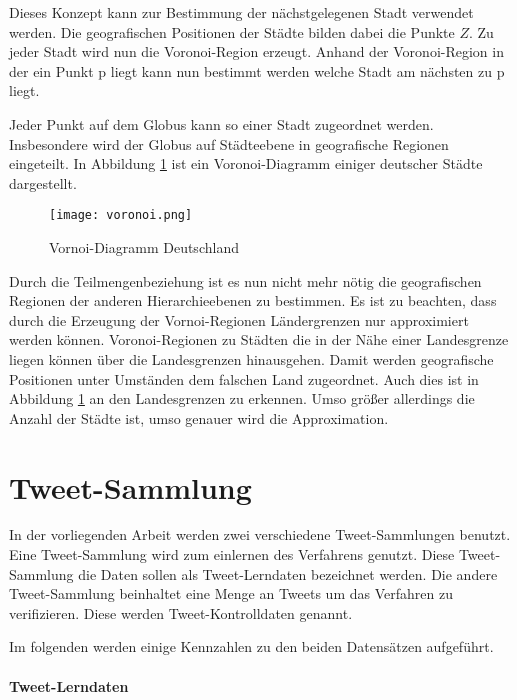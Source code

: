 				Dieses Konzept kann zur Bestimmung der nächstgelegenen Stadt verwendet werden. 
				Die geografischen Positionen der Städte bilden dabei die Punkte $Z$.
				Zu jeder Stadt wird nun die Voronoi-Region erzeugt. 
				Anhand der Voronoi-Region in der ein Punkt p liegt kann nun bestimmt werden welche Stadt am nächsten zu p liegt.

				Jeder Punkt auf dem Globus kann so einer Stadt zugeordnet werden.
				Insbesondere wird der Globus auf Städteebene in geografische Regionen eingeteilt.
				In Abbildung \ref{img:voronoi} ist ein Voronoi-Diagramm einiger deutscher Städte dargestellt.

				\begin{figure}[h!]
				\begin{center}
				\texttt{[image: voronoi.png]}
				\caption{Vornoi-Diagramm Deutschland}
				\label{img:voronoi}
				\end{center}
				\end{figure}	

				Durch die Teilmengenbeziehung ist es nun nicht mehr nötig die geografischen Regionen der anderen Hierarchieebenen zu bestimmen.
				Es ist zu beachten, dass durch die Erzeugung der Vornoi-Regionen Ländergrenzen nur approximiert werden können. 
				Voronoi-Regionen zu Städten die in der Nähe einer Landesgrenze liegen können über die Landesgrenzen hinausgehen. 
				Damit werden geografische Positionen unter Umständen dem falschen Land zugeordnet.
				Auch dies ist in Abbildung \ref{img:voronoi} an den Landesgrenzen zu erkennen. 
				Umso größer allerdings die Anzahl der Städte ist, umso genauer wird die Approximation. 



\section{Tweet-Sammlung} 
		
		In der vorliegenden Arbeit werden zwei verschiedene Tweet-Sammlungen benutzt.
		Eine Tweet-Sammlung wird zum einlernen des Verfahrens genutzt.
		Diese Tweet-Sammlung die Daten sollen als Tweet-Lerndaten bezeichnet werden.
		Die andere Tweet-Sammlung beinhaltet eine Menge an Tweets um das Verfahren zu verifizieren.
		Diese werden Tweet-Kontrolldaten genannt.

		Im folgenden werden einige Kennzahlen zu den beiden Datensätzen aufgeführt.

		\paragraph{Tweet-Lerndaten} 

